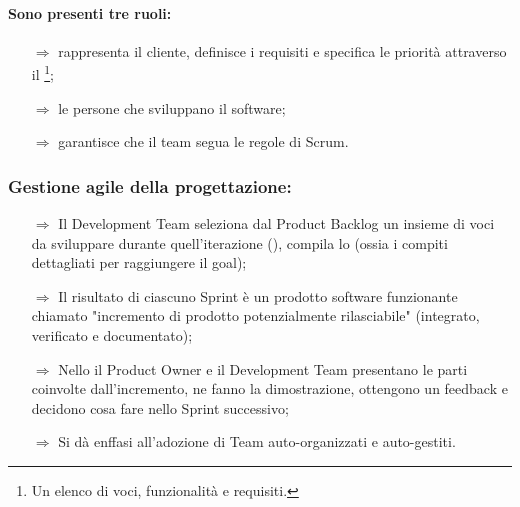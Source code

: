 \paragraph{Sono presenti tre ruoli:}

\begin{itemize}
    \item [$\Rightarrow$]  rappresenta il cliente, definisce i requisiti
    e specifica le priorità attraverso il \footnote{Un elenco di voci, funzionalità e requisiti.};
    \item [$\Rightarrow$]  le persone che sviluppano il software;
    \item [$\Rightarrow$]  garantisce che il team segua le regole di Scrum.
\end{itemize}

\subsubsection{Gestione agile della progettazione:}

\begin{itemize}
    \item [$\Rightarrow$] Il Development Team seleziona dal Product Backlog un insieme di voci
    da sviluppare durante quell'iterazione (), compila 
    lo  (ossia i compiti dettagliati per raggiungere il goal);
    \item [$\Rightarrow$] Il risultato di ciascuno Sprint è un prodotto software funzionante
    chiamato "incremento di prodotto potenzialmente rilasciabile" (integrato, verificato e documentato);
    \item [$\Rightarrow$] Nello  il Product Owner e il Development Team presentano le parti
    coinvolte dall'incremento, ne fanno la dimostrazione, ottengono un feedback e decidono cosa fare nello Sprint successivo;
    \item [$\Rightarrow$] Si dà enffasi all'adozione di Team auto-organizzati e auto-gestiti.
\end{itemize}
